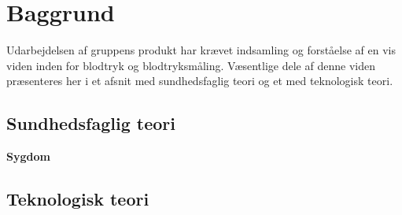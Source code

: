 \chapter{Baggrund}\label{kapitel_Baggrund}
Udarbejdelsen af gruppens produkt har krævet indsamling og forståelse af en vis viden inden for blodtryk og blodtryksmåling.
Væsentlige dele af denne viden præsenteres her i et afsnit med sundhedsfaglig teori og et med teknologisk teori.

\section{Sundhedsfaglig teori}

\textbf{Sygdom}\\

\section{Teknologisk teori}

